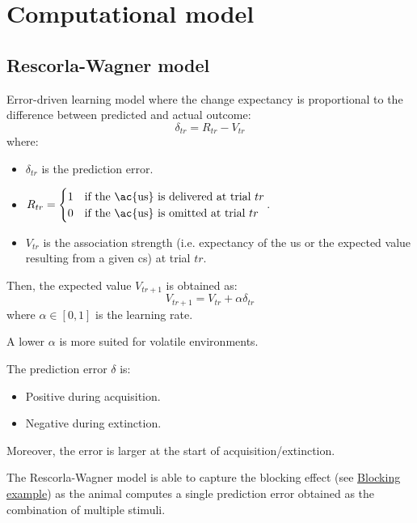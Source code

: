 \section{Computational model}


\subsection{Rescorla-Wagner model}

Error-driven learning model where the change expectancy is proportional to the difference between predicted and actual outcome:
\[ \delta_{tr} = R_{tr} - V_{tr} \]
where:
\begin{itemize}
    \item $\delta_{tr}$ is the prediction error.
    \item $R_{tr} = \begin{cases}
            1 & \text{if the \ac{us} is delivered at trial $tr$} \\
            0 & \text{if the \ac{us} is omitted at trial $tr$}
        \end{cases}$.
    \item $V_{tr}$ is the association strength (i.e. expectancy of the \ac{us} or the expected value resulting from a given \ac{cs}) at trial $tr$.
\end{itemize}

Then, the expected value $V_{tr+1}$ is obtained as:
\[ V_{tr+1} = V_{tr} + \alpha \delta_{tr} \]
where $\alpha \in [0, 1]$ is the learning rate.

\begin{remark}
    A lower $\alpha$ is more suited for volatile environments.
\end{remark}

\begin{remark}
    The prediction error $\delta$ is:
    \begin{itemize}
        \item Positive during acquisition.
        \item Negative during extinction.
    \end{itemize}
    Moreover, the error is larger at the start of acquisition/extinction.
\end{remark}

\begin{remark}
    The Rescorla-Wagner model is able to capture the blocking effect (see \hyperref[ex:blocking]{Blocking example}) as
    the animal computes a single prediction error obtained as the combination of multiple stimuli.
\end{remark}

